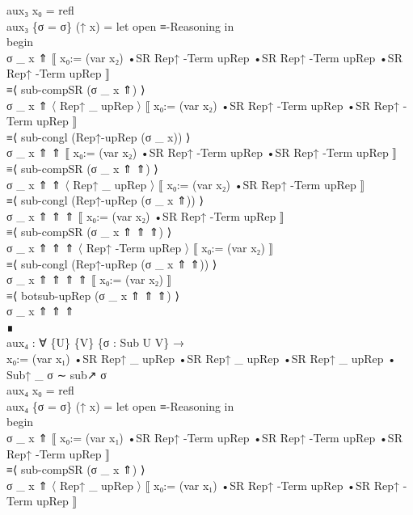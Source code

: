 {\begin{code}
{\>    aux₃ x₀ = refl\<\\
\>    aux₃ \{σ = σ\} (↑ x) = let open ≡-Reasoning in \<\\
\>      begin\<\\
\>        σ \_ x ⇑ ⟦ x₀:= (var x₂) •SR Rep↑ -Term upRep •SR Rep↑ -Term upRep •SR Rep↑ -Term upRep ⟧\<\\
\>      ≡⟨ sub-compSR (σ \_ x ⇑) ⟩\<\\
\>        σ \_ x ⇑ 〈 Rep↑ \_ upRep 〉 ⟦ x₀:= (var x₂) •SR Rep↑ -Term upRep •SR Rep↑ -Term upRep ⟧\<\\
\>      ≡⟨ sub-congl (Rep↑-upRep (σ \_ x)) ⟩\<\\
\>        σ \_ x ⇑ ⇑ ⟦ x₀:= (var x₂) •SR Rep↑ -Term upRep •SR Rep↑ -Term upRep ⟧\<\\
\>      ≡⟨ sub-compSR (σ \_ x  ⇑ ⇑) ⟩\<\\
\>        σ \_ x  ⇑ ⇑ 〈 Rep↑ \_ upRep 〉 ⟦ x₀:= (var x₂) •SR Rep↑ -Term upRep ⟧\<\\
\>      ≡⟨ sub-congl (Rep↑-upRep (σ \_ x  ⇑)) ⟩\<\\
\>        σ \_ x  ⇑ ⇑ ⇑ ⟦ x₀:= (var x₂) •SR Rep↑ -Term upRep ⟧\<\\
\>      ≡⟨ sub-compSR (σ \_ x  ⇑ ⇑ ⇑) ⟩\<\\
\>        σ \_ x  ⇑ ⇑ ⇑ 〈 Rep↑ -Term upRep 〉 ⟦ x₀:= (var x₂) ⟧\<\\
\>      ≡⟨ sub-congl (Rep↑-upRep (σ \_ x  ⇑ ⇑)) ⟩\<\\
\>        σ \_ x  ⇑ ⇑ ⇑ ⇑ ⟦ x₀:= (var x₂) ⟧\<\\
\>      ≡⟨ botsub-upRep (σ \_ x  ⇑ ⇑ ⇑) ⟩\<\\
\>        σ \_ x  ⇑ ⇑ ⇑\<\\
\>      ∎\<\\
\>    aux₄ : ∀ \{U\} \{V\} \{σ : Sub U V\} → \<\\
\>        x₀:= (var x₁) •SR Rep↑ \_ upRep •SR Rep↑ \_ upRep •SR Rep↑ \_ upRep • Sub↑ \_ σ ∼ sub↗ σ\<\\
\>    aux₄ x₀ = refl\<\\
\>    aux₄ \{σ = σ\} (↑ x) = let open ≡-Reasoning in \<\\
\>      begin\<\\
\>        σ \_ x ⇑ ⟦ x₀:= (var x₁) •SR Rep↑ -Term upRep •SR Rep↑ -Term upRep •SR Rep↑ -Term upRep ⟧\<\\
\>      ≡⟨ sub-compSR (σ \_ x  ⇑) ⟩\<\\
\>        σ \_ x  ⇑ 〈 Rep↑ \_ upRep 〉 ⟦ x₀:= (var x₁) •SR Rep↑ -Term upRep •SR Rep↑ -Term upRep ⟧\<\\
}
\end{code}}
